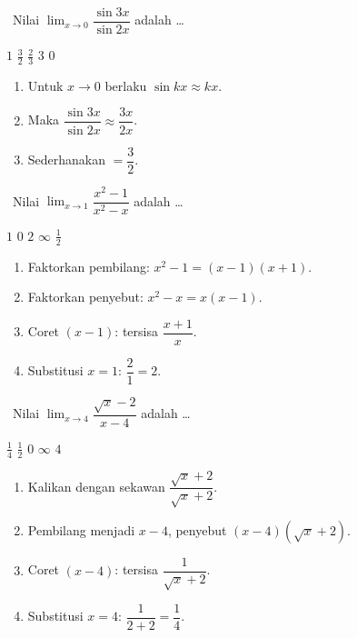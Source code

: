 \documentclass[11pt,a4paper]{exam}
\newenvironment{langkah}{%
  \begin{enumerate}[label=\textbf{Langkah \arabic*:},leftmargin=2.6em,
    itemsep=2pt,topsep=2pt]}{\end{enumerate}}
\newcommand{\Adv}{{\footnotesize\textsf{\textcolor{oranye}{[Advanced]}}}\ }
\begin{document}
\begin{questions}
\question \Adv Nilai $\displaystyle\lim_{x\to 0}\dfrac{\sin 3x}{\sin 2x}$ adalah \dots
\begin{choices}
\choice $1$ \CorrectChoice $\tfrac{3}{2}$ \choice $\tfrac{2}{3}$ \choice $3$ \choice $0$
\end{choices}
\begin{solution}
\begin{langkah}
\item Untuk $x\to 0$ berlaku $\sin kx \approx kx$.
\item Maka $\dfrac{\sin 3x}{\sin 2x} \approx \dfrac{3x}{2x}$.
\item Sederhanakan $= \dfrac{3}{2}$.
\end{langkah}
\end{solution}

\question \Adv Nilai $\displaystyle\lim_{x\to 1}\dfrac{x^{2}-1}{x^{2}-x}$ adalah \dots
\begin{choices}
\choice $1$ \choice $0$ \CorrectChoice $2$ \choice $\infty$ \choice $\tfrac{1}{2}$
\end{choices}
\begin{solution}
\begin{langkah}
\item Faktorkan pembilang: $x^{2}-1 = (x-1)(x+1)$.
\item Faktorkan penyebut: $x^{2}-x = x(x-1)$.
\item Coret $(x-1)$: tersisa $\dfrac{x+1}{x}$.
\item Substitusi $x=1$: $\dfrac{2}{1} = 2$.
\end{langkah}
\end{solution}

\question \Adv Nilai $\displaystyle\lim_{x\to 4}\dfrac{\sqrt{x}-2}{x-4}$ adalah \dots
\begin{choices}
\CorrectChoice $\tfrac{1}{4}$ \choice $\tfrac{1}{2}$ \choice $0$ \choice $\infty$ \choice $4$
\end{choices}
\begin{solution}
\begin{langkah}
\item Kalikan dengan sekawan $\dfrac{\sqrt{x}+2}{\sqrt{x}+2}$.
\item Pembilang menjadi $x-4$, penyebut $(x-4)(\sqrt{x}+2)$.
\item Coret $(x-4)$: tersisa $\dfrac{1}{\sqrt{x}+2}$.
\item Substitusi $x=4$: $\dfrac{1}{2+2} = \dfrac{1}{4}$.
\end{langkah}
\end{solution}


\end{questions}
\end{document}
